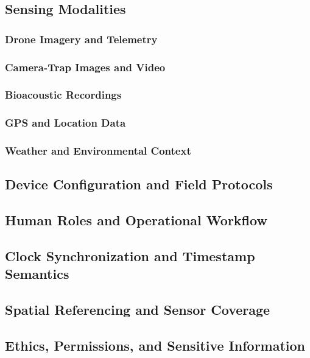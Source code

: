 \documentclass[manuscript]{acmart}
\begin{document}
\subsection{Sensing Modalities}

\subsubsection{Drone Imagery and Telemetry}
\subsubsection{Camera-Trap Images and Video}
\subsubsection{Bioacoustic Recordings}
\subsubsection{GPS and Location Data}
\subsubsection{Weather and Environmental Context}

\subsection{Device Configuration and Field Protocols}

\subsection{Human Roles and Operational Workflow}

\subsection{Clock Synchronization and Timestamp Semantics}

\subsection{Spatial Referencing and Sensor Coverage}

\subsection{Ethics, Permissions, and Sensitive Information}

\newpage
\end{document}
